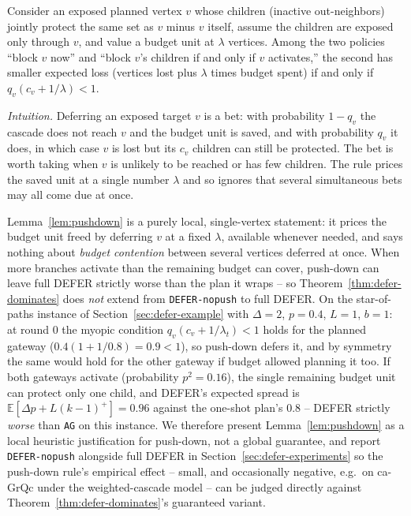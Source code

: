 \documentclass[ASNA,number]{USG}
\begin{document}
\begin{lemma}\label{lem:pushdown}
Consider an exposed planned vertex $v$ whose children (inactive
out-neighbors) jointly protect the same set as $v$ minus $v$ itself, assume
the children are exposed only through $v$, and value a budget unit at
$\lambda$ vertices. Among the two policies ``block $v$ now'' and ``block
$v$'s children if and only if $v$ activates,'' the second has smaller
expected loss (vertices lost plus $\lambda$ times budget spent) if and only
if $q_v(c_v+1/\lambda)<1$.
\end{lemma}

\emph{Intuition.} Deferring an exposed target $v$ is a bet: with
probability $1-q_v$ the cascade does not reach $v$ and the budget unit is
saved, and with probability $q_v$ it does, in which case $v$ is lost but its
$c_v$ children can still be protected. The bet is worth taking when $v$ is
unlikely to be reached or has few children. The rule prices the saved unit
at a single number $\lambda$ and so ignores that several simultaneous bets
may all come due at once.

\begin{remark}\label{rem:pushdown-counterexample}
Lemma~\ref{lem:pushdown} is a purely local, single-vertex statement: it
prices the budget unit freed by deferring $v$ at a fixed $\lambda$,
available whenever needed, and says nothing about \emph{budget contention}
between several vertices deferred at once. When more branches activate
than the remaining budget can cover, push-down can leave full DEFER
strictly worse than the plan it wraps -- so Theorem~\ref{thm:defer-dominates}
does \emph{not} extend from \texttt{DEFER-nopush} to full DEFER. On the
star-of-paths instance of Section~\ref{sec:defer-example} with $\Delta=2$,
$p=0.4$, $L=1$, $b=1$: at round $0$ the myopic condition
$q_v(c_v+1/\lambda_t)<1$ holds for the planned gateway
($0.4(1+1/0.8)=0.9<1$), so push-down defers it, and by symmetry the same
would hold for the other gateway if budget allowed planning it too. If
both gateways activate (probability $p^2=0.16$), the single remaining
budget unit can protect only one child, and DEFER's expected spread is
$\mathbb E[\Delta p+L(k-1)^+]=0.96$ against the one-shot plan's $0.8$
-- DEFER strictly \emph{worse} than \texttt{AG} on this instance. We
therefore present Lemma~\ref{lem:pushdown} as a local heuristic
justification for push-down, not a global guarantee, and report
\texttt{DEFER-nopush} alongside full DEFER in
Section~\ref{sec:defer-experiments} so the push-down rule's empirical
effect -- small, and occasionally negative, e.g.\ on ca-GrQc under the
weighted-cascade model -- can be judged directly against
Theorem~\ref{thm:defer-dominates}'s guaranteed variant.
\end{remark}
\end{document}
